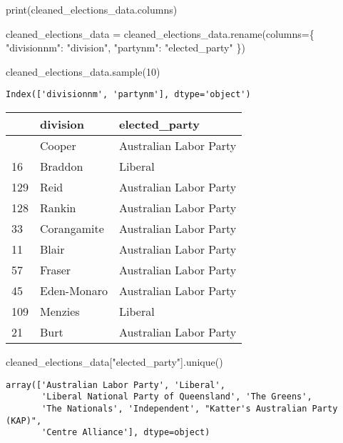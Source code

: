 \documentclass[
  letterpaper,
  DIV=11,
  numbers=noendperiod]{scrreprt}
\newenvironment{Shaded}{\begin{snugshade}}{\end{snugshade}}
\newcommand{\BuiltInTok}[1]{\textcolor[rgb]{0.00,0.23,0.31}{#1}}
\newcommand{\DecValTok}[1]{\textcolor[rgb]{0.68,0.00,0.00}{#1}}
\newcommand{\NormalTok}[1]{\textcolor[rgb]{0.00,0.23,0.31}{#1}}
\newcommand{\OperatorTok}[1]{\textcolor[rgb]{0.37,0.37,0.37}{#1}}
\newcommand{\StringTok}[1]{\textcolor[rgb]{0.13,0.47,0.30}{#1}}
\begin{document}
\begin{Shaded}
\begin{Highlighting}[]
\BuiltInTok{print}\NormalTok{(cleaned\_elections\_data.columns)}

\NormalTok{cleaned\_elections\_data }\OperatorTok{=}\NormalTok{ cleaned\_elections\_data.rename(columns}\OperatorTok{=}\NormalTok{\{}
    \StringTok{"divisionnm"}\NormalTok{: }\StringTok{"division"}\NormalTok{,}
    \StringTok{"partynm"}\NormalTok{: }\StringTok{"elected\_party"}
\NormalTok{\})}

\NormalTok{cleaned\_elections\_data.sample(}\DecValTok{10}\NormalTok{)}
\end{Highlighting}
\end{Shaded}

\begin{verbatim}
Index(['divisionnm', 'partynm'], dtype='object')
\end{verbatim}

\begin{longtable}[]{@{}lll@{}}
\toprule\noalign{}
& division & elected\_party \\
\midrule\noalign{}
\endhead
\bottomrule\noalign{}
\endlastfoot
32 & Cooper & Australian Labor Party \\
16 & Braddon & Liberal \\
129 & Reid & Australian Labor Party \\
128 & Rankin & Australian Labor Party \\
33 & Corangamite & Australian Labor Party \\
11 & Blair & Australian Labor Party \\
57 & Fraser & Australian Labor Party \\
45 & Eden-Monaro & Australian Labor Party \\
109 & Menzies & Liberal \\
21 & Burt & Australian Labor Party \\
\end{longtable}

\begin{Shaded}
\begin{Highlighting}[]
\NormalTok{cleaned\_elections\_data[}\StringTok{"elected\_party"}\NormalTok{].unique()}
\end{Highlighting}
\end{Shaded}

\begin{verbatim}
array(['Australian Labor Party', 'Liberal',
       'Liberal National Party of Queensland', 'The Greens',
       'The Nationals', 'Independent', "Katter's Australian Party (KAP)",
       'Centre Alliance'], dtype=object)
\end{verbatim}
\end{document}
